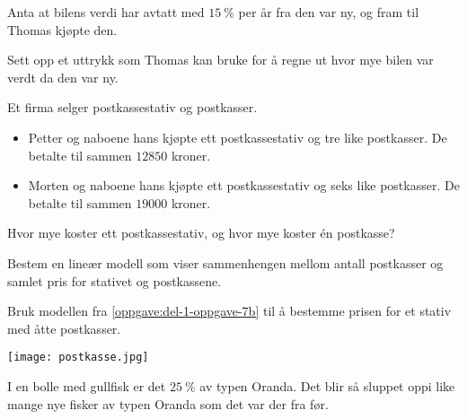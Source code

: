 Anta at bilens verdi har avtatt med $\SI{15}{\percent}$ per år fra den var ny,
og fram til Thomas kjøpte den.

\begin{oppgaver}
   Sett opp et uttrykk som Thomas kan bruke for å regne ut hvor mye
    bilen var verdt da den var ny.
\end{oppgaver}


\Oppgave[4] %

Et firma selger postkassestativ og postkasser.

\begin{itemize}
  \item Petter og naboene hans kjøpte ett postkassestativ og tre like
    postkasser. De betalte til sammen $\num{12850}$ kroner.
  \item Morten og naboene hans kjøpte ett postkassestativ og seks like
    postkasser. De betalte til sammen $\num{19000}$ kroner.
\end{itemize}

\begin{oppgaver}
   Hvor mye koster ett postkassestativ, og hvor mye koster én
    postkasse?
\end{oppgaver}

\begin{oppgaver}
   Bestem en lineær modell som viser sammenhengen mellom antall
    postkasser og samlet pris for stativet og postkassene.
    \label{oppgave:del-1-oppgave-7b}
\end{oppgaver}

\begin{oppgaver}
   Bruk modellen fra \cref{oppgave:del-1-oppgave-7b} til å bestemme
    prisen for et stativ med åtte postkasser.
\end{oppgaver}

\begin{center}
  \texttt{[image: postkasse.jpg]}
\end{center}


\Oppgave[2] %

I en bolle med gullfisk er det $\SI{25}{\percent}$ av typen Oranda. Det blir så
sluppet oppi like mange nye fisker av typen Oranda som det var der fra før.
\medskip

